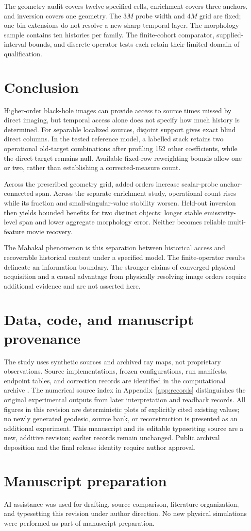 The geometry audit covers twelve specified cells, enrichment covers three anchors, and inversion covers one geometry. The $3M$ probe width and $4M$ grid are fixed; one-bin extensions do not resolve a new sharp temporal layer. The morphology sample contains ten histories per family. The finite-cohort comparator, supplied-interval bounds, and discrete operator tests each retain their limited domain of qualification.

\section{Conclusion}
Higher-order black-hole images can provide access to source times missed by direct imaging, but temporal access alone does not specify how much history is determined. For separable localized sources, disjoint support gives exact blind direct columns. In the tested reference model, a labelled stack retains two operational old-target combinations after profiling 152 other coefficients, while the direct target remains null. Available fixed-row reweighting bounds allow one or two, rather than establishing a corrected-measure count.

Across the prescribed geometry grid, added orders increase scalar-probe anchor-connected span. Across the separate enrichment study, operational count rises while its fraction and small-singular-value stability worsen. Held-out inversion then yields bounded benefits for two distinct objects: longer stable emissivity-level span and lower aggregate morphology error. Neither becomes reliable multi-feature movie recovery.

The Mahakal phenomenon is this separation between historical access and recoverable historical content under a specified model. The finite-operator results delineate an information boundary. The stronger claims of converged physical acquisition and a causal advantage from physically resolving image orders require additional evidence and are not asserted here.

\section*{Data, code, and manuscript provenance}
The study uses synthetic sources and archived ray maps, not proprietary observations. Source implementations, frozen configurations, run manifests, endpoint tables, and correction records are identified in the computational archive \cite{archive}. The numerical source index in Appendix~\ref{app:records} distinguishes the original experimental outputs from later interpretation and readback records. All figures in this revision are deterministic plots of explicitly cited existing values; no newly generated geodesic, source bank, or reconstruction is presented as an additional experiment. This manuscript and its editable typesetting source are a new, additive revision; earlier records remain unchanged. Public archival deposition and the final release identity require author approval.

\section*{Manuscript preparation}
AI assistance was used for drafting, source comparison, literature organization, and typesetting this revision under author direction. No new physical simulations were performed as part of manuscript preparation.
\FloatBarrier
